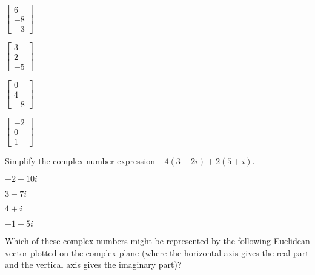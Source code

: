 \documentclass{article}
\begin{document}
\begin{readinessAssuranceTest}
\begin{multicols}{4}
\begin{readinessAssuranceTestChoices}
\item \(
        \begin{bmatrix}
          6 \\ -8 \\ -3
        \end{bmatrix}
      \)
\item \(
        \begin{bmatrix}
          3 \\ 2 \\ -5
        \end{bmatrix}
      \)
\item \(
        \begin{bmatrix}
          0 \\ 4 \\ -8
        \end{bmatrix}
      \) %
\item \(
        \begin{bmatrix}
          -2 \\ 0 \\ 1
        \end{bmatrix}
      \)
\end{readinessAssuranceTestChoices}
\end{multicols}

\item Simplify the complex number expression
      \(-4(3-2i)+2(5+i)\).

\begin{multicols}{4}
\begin{readinessAssuranceTestChoices}
\item \(-2+10i\) %
\item \(3-7i\)
\item \(4+i\)
\item \(-1-5i\)
\end{readinessAssuranceTestChoices}
\end{multicols}

\item Which of these complex numbers might be represented
      by the following Euclidean vector
      plotted on the complex plane (where the horizontal axis gives the
      real part and the vertical axis gives the imaginary part)?

      \begin{center}
      \end{center}


\end{readinessAssuranceTest}
\end{document}
